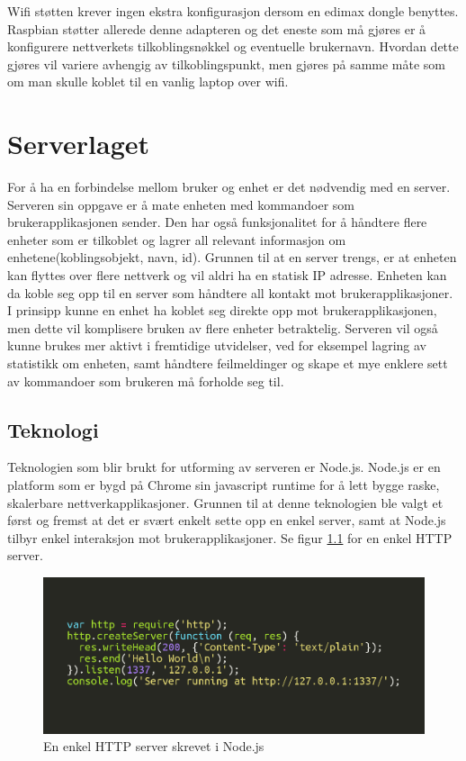 \documentclass[12pt]{report}
\begin{document}
Wifi støtten krever ingen ekstra konfigurasjon dersom en edimax dongle benyttes. Raspbian støtter allerede denne adapteren og det eneste som må gjøres er å konfigurere nettverkets tilkoblingsnøkkel og eventuelle brukernavn. Hvordan dette gjøres vil variere avhengig av tilkoblingspunkt, men gjøres på samme måte som om man skulle koblet til en vanlig laptop over wifi.

\clearpage

\chapter{Serverlaget}
For å ha en forbindelse mellom bruker og enhet er det nødvendig med en server. Serveren sin oppgave er å mate enheten med kommandoer som brukerapplikasjonen sender. Den har også funksjonalitet for å håndtere flere enheter som er tilkoblet og lagrer all relevant informasjon om enhetene(koblingsobjekt, navn, id). Grunnen til at en server trengs, er at enheten kan flyttes over flere nettverk og vil aldri ha en statisk IP adresse. Enheten kan da koble seg opp til en server som håndtere all kontakt mot brukerapplikasjoner. I prinsipp kunne en enhet ha koblet seg direkte opp mot brukerapplikasjonen, men dette vil komplisere bruken av flere enheter betraktelig. Serveren vil også kunne brukes mer aktivt i fremtidige utvidelser, ved for eksempel lagring av statistikk om enheten, samt håndtere feilmeldinger og skape et mye enklere sett av kommandoer som brukeren må forholde seg til.

\section{Teknologi}
Teknologien som blir brukt for utforming av serveren er Node.js\cite{Nodejs}. Node.js er en platform som er bygd på Chrome sin javascript runtime for å lett bygge raske, skalerbare nettverkapplikasjoner. Grunnen til at denne teknologien ble valgt et først og fremst at det er svært enkelt sette opp en enkel server, samt at Node.js tilbyr enkel interaksjon mot brukerapplikasjoner. Se figur \ref{htpserv} for en enkel HTTP server.

\begin{figure}[H]
	\includegraphics[scale=1.2]{imgs/node_basic_server}
	\centering
	\caption{En enkel HTTP server skrevet i Node.js}
	\label{htpserv}
\end{figure}
\end{document}

